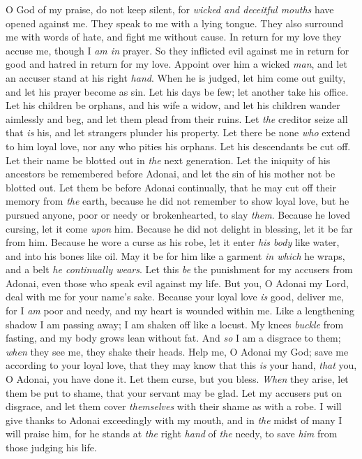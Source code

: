 \begin{biblechapter} %
 O God of my praise, do not keep silent,
\verse for \textit{wicked and deceitful mouths} 
have opened against me. 
They speak to me with a lying tongue.
\verse They also surround me with words of hate, 
and fight me without cause.
\verse In return for my love they accuse me, 
though I \textit{am in} prayer.
\verse So they inflicted evil against me in return for good 
and hatred in return for my love.
\verse Appoint over him a wicked \textit{man}, 
and let an accuser stand at his right \textit{hand}.
\verse When he is judged, let him come out guilty, 
and let his prayer become as sin.
\verse Let his days be few; 
let another take his office.
\verse Let his children be orphans, 
and his wife a widow,
\verse and let his children wander aimlessly and beg, 
and let them plead from their ruins.
\verse Let \textit{the} creditor seize all that \textit{is} his, 
and let strangers plunder his property.
\verse Let there be none \textit{who} extend to him loyal love, 
nor any who pities his orphans.
\verse Let his descendants be cut off. 
Let their name be blotted out in \textit{the} next generation.
\verse Let the iniquity of his ancestors be remembered before Adonai, 
and let the sin of his mother not be blotted out.
\verse Let them be before Adonai continually, 
that he may cut off their memory from \textit{the} earth,
\verse because he did not remember to show loyal love, 
but he pursued anyone, poor or needy 
or brokenhearted, to slay \textit{them}.
\verse Because he loved cursing, let it come \textit{upon} him. 
Because he did not delight in blessing, 
let it be far from him.
\verse Because he wore a curse as his robe, 
let it enter \textit{his body} like water, 
and into his bones like oil.
\verse May it be for him like a garment \textit{in which} he wraps, 
and a belt \textit{he continually wears}.
\verse Let this \textit{be} the punishment for my accusers from Adonai, 
even those who speak evil against my life.
\verse But you, O Adonai my Lord, 
deal with me for your name’s sake. 
Because your loyal love \textit{is} good, deliver me,
\verse for I \textit{am} poor and needy, 
and my heart is wounded within me.
\verse Like a lengthening shadow I am passing away; 
I am shaken off like a locust.
\verse My knees \textit{buckle} from fasting, 
and my body grows lean without fat.
\verse And \textit{so} I am a disgrace to them; 
\textit{when} they see me, they shake their heads.
\verse Help me, O Adonai my God; 
save me according to your loyal love,
\verse that they may know that this \textit{is} your hand, 
\textit{that} you, O Adonai, you have done it.
\verse Let them curse, but you bless. 
\textit{When} they arise, let them be put to shame, 
that your servant may be glad.
\verse Let my accusers put on disgrace, 
and let them cover \textit{themselves} with their shame as with a robe.
\verse I will give thanks to Adonai exceedingly with my mouth, 
and in \textit{the} midst of many I will praise him,
\verse for he stands at \textit{the} right \textit{hand} of \textit{the} needy, 
to save \textit{him} from those judging his life.
\end{biblechapter}

